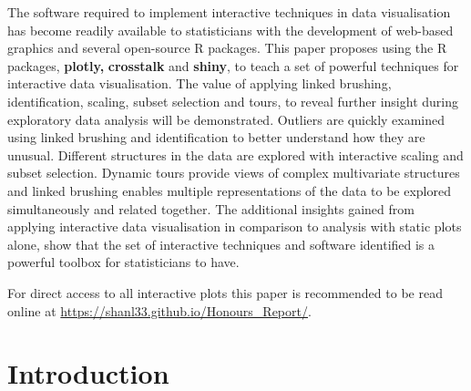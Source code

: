 \documentclass[11pt]{book}
\begin{document}


The software required to implement interactive techniques in data visualisation has become readily available to statisticians with the development of web-based graphics and several open-source R packages. This paper proposes using the R packages, \textbf{plotly,} \textbf{crosstalk} and \textbf{shiny}, to teach a set of powerful techniques for interactive data visualisation. The value of applying linked brushing, identification, scaling, subset selection and tours, to reveal further insight during exploratory data analysis will be demonstrated. Outliers are quickly examined using linked brushing and identification to better understand how they are unusual. Different structures in the data are explored with interactive scaling and subset selection. Dynamic tours provide views of complex multivariate structures and linked brushing enables multiple representations of the data to be explored simultaneously and related together. The additional insights gained from applying interactive data visualisation in comparison to analysis with static plots alone, show that the set of interactive techniques and software identified is a powerful toolbox for statisticians to have.

For direct access to all interactive plots this paper is recommended to be read online at \href{https://shanl33.github.io/Honours_Report/}{https://shanl33.github.io/Honours_Report/}.






\setcounter{secnumdepth}{3} %
\setcounter{tocdepth}{3}    %
\tableofcontents            %



	
\chapter{Introduction}%
\end{document}
